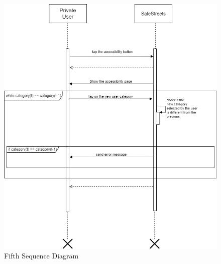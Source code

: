 \documentclass[titlepage]{article}
\begin{document}
\begin{itemize}
\begin{figure}[h]
	\includegraphics[scale=0.51]{Sequence Diagrams/Sequence diagram change category.png}
	\centering
	\caption{Fifth Sequence Diagram}
\end{figure}
\FloatBarrier 


\end{itemize}


\newpage
\end{document}
